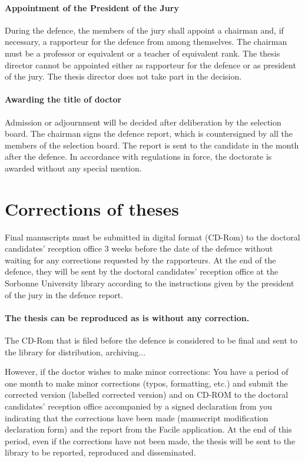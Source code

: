 \paragraph{Appointment of the President of the Jury}

During the defence, the members of the jury shall appoint a chairman and, if necessary, a rapporteur for the defence from among themselves. The chairman must be a professor or equivalent or a teacher of equivalent rank.
The thesis director cannot be appointed either as rapporteur for the defence or as president of the jury. The thesis director does not take part in the decision.

\paragraph{Awarding the title of doctor}

Admission or adjournment will be decided after deliberation by the selection board. The chairman signs the defence report, which is countersigned by all the members of the selection board. The report is sent to the candidate in the month after the defence.
In accordance with regulations in force, the doctorate is awarded without any special mention. 

\section{Corrections of theses}
\label{sec:corrections-of-theses}

Final manuscripts must be submitted in digital format (CD-Rom) to the doctoral candidates' reception office 3 weeks before the date of the defence without waiting for any corrections requested by the rapporteurs. 
At the end of the defence, they will be sent by the doctoral candidates' reception office at the Sorbonne University library according to the instructions given by the president of the jury in the defence report.

\paragraph{The thesis can be reproduced as is without any correction.}
The CD-Rom that is filed before the defence is considered to be final and sent to the library for distribution, archiving... 

However, if the doctor wishes to make minor corrections:
You have a period of one month to make minor corrections (typos, formatting, etc.) and submit the corrected version (labelled corrected version) and on CD-ROM to the doctoral candidates' reception office accompanied by a signed declaration from you indicating that the corrections have been made (manuscript modification declaration form) and the report from the Facile application.
At the end of this period, even if the corrections have not been made, the thesis will be sent to the library to be reported, reproduced and disseminated.

